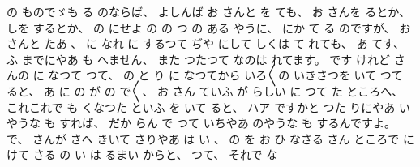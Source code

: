 の
ものでゞも
る
のならば、
%
よしんば
お
さんと
を
ても、
%
お
さんを
るとか、
%
しを
するとか、
%
の
にせよ
の
%
の
つ
の
ある
やうに、
%
にか
て
る
のですが、
%
お
さんと
たあ
、
%
に
なれ
に
するつて
ぢや
にして
しくは
て
れても、
%
あ
てす、
%
ふ
までにやあ
も
へません、
%
また
つたつて
なのは
れてます。
%
です
けれど
さんの
に
なつて
つて、
%
の
と
り
に
なつてから
いろ〳〵の
いきさつを
いて
つて
ると、
%
あ
に
の
が
の
で〳〵、
%
お
さん
ていふ
が
%
らしい
に
つて
た
ところへ、
%
これこれで%
も
くなつた
といふ
を
いて
ると、
ハア
ですかと
つた
りにやあ
いやうな
も
すれば、
%
だか
らん
で
つて
いちやあ
のやうな
も
するんですよ。
%
で、
%
さんが
さへ
きいて
さりやあ
は
い
、
%
の
を
お
ひ
なさる
さん
ところで
に
けて
さる
の
い
は
るまい
%
からと、
%
つて、
%
それで
な
